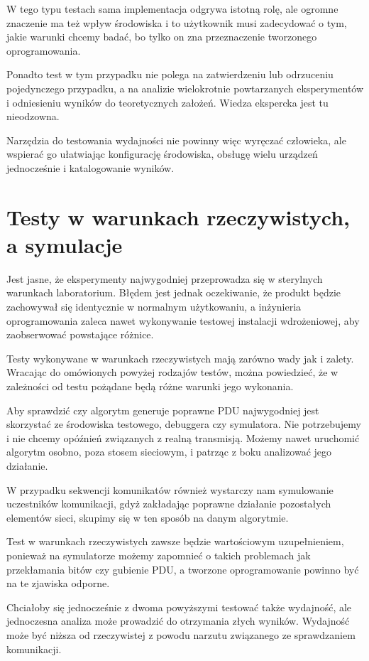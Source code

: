 \documentclass[00-praca-magisterska.tex]{subfiles}
\begin{document}
W tego typu testach sama implementacja odgrywa istotną rolę, ale ogromne
znaczenie ma też wpływ środowiska i to użytkownik musi zadecydować o tym, jakie
warunki chcemy badać, bo tylko on zna przeznaczenie tworzonego oprogramowania.

Ponadto test w tym przypadku nie polega na zatwierdzeniu lub odrzuceniu
pojedynczego przypadku, a na analizie wielokrotnie powtarzanych eksperymentów i
odniesieniu wyników do teoretycznych założeń. Wiedza ekspercka jest tu
nieodzowna.

Narzędzia do testowania wydajności nie powinny więc wyręczać człowieka, ale
wspierać go ułatwiając konfigurację środowiska, obsługę wielu urządzeń
jednocześnie i katalogowanie wyników.

\section{Testy w warunkach rzeczywistych, a symulacje}

Jest jasne, że eksperymenty najwygodniej przeprowadza się w sterylnych
warunkach laboratorium. Błędem jest jednak oczekiwanie, że produkt będzie
zachowywał się identycznie w normalnym użytkowaniu, a inżynieria oprogramowania
zaleca nawet wykonywanie testowej instalacji wdrożeniowej, aby zaobserwować
powstające różnice.

Testy wykonywane w warunkach rzeczywistych mają zarówno wady jak i zalety.
Wracając do omówionych powyżej rodzajów testów, można powiedzieć, że w
zależności od testu pożądane będą różne warunki jego wykonania.

Aby sprawdzić czy algorytm generuje poprawne PDU najwygodniej jest skorzystać
ze środowiska testowego, debuggera czy symulatora. Nie potrzebujemy i nie
chcemy opóźnień związanych z realną transmisją. Możemy nawet uruchomić algorytm
osobno, poza stosem sieciowym, i patrząc z boku analizować jego działanie.

W przypadku sekwencji komunikatów również wystarczy nam symulowanie
uczestników komunikacji, gdyż zakładając poprawne działanie pozostałych
elementów sieci, skupimy się w ten sposób na danym algorytmie.

Test w warunkach rzeczywistych zawsze będzie wartościowym uzupełnieniem,
ponieważ na symulatorze możemy zapomnieć o takich problemach jak przekłamania
bitów czy gubienie PDU, a tworzone oprogramowanie powinno być na te zjawiska odporne.

Chciałoby się jednocześnie z dwoma powyższymi testować także wydajność, ale
jednoczesna analiza może prowadzić do otrzymania złych wyników. Wydajność może
być niższa od rzeczywistej z powodu narzutu związanego ze sprawdzaniem
komunikacji.
\end{document}
